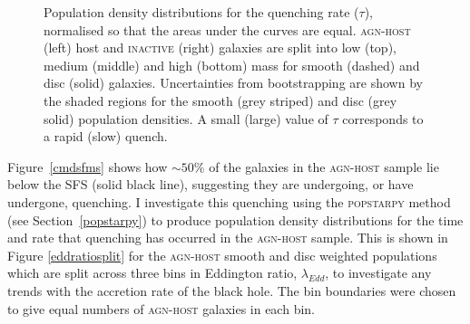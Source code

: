 \begin{figure}
\caption[Quenching rate population density distributions for the \textsc{agn-host} and \textsc{inactive} samples]{Population density distributions for the quenching rate ($\tau$), normalised so that the areas under the curves are equal. \textsc{agn-host} (left) host and \textsc{inactive} (right) galaxies are split into low (top), medium (middle) and high (bottom) mass for smooth (dashed) and disc (solid) galaxies. Uncertainties from bootstrapping are shown by the shaded regions for the smooth (grey striped) and disc (grey solid) population densities. A small (large) value of $\tau$ corresponds to a rapid (slow) quench.}
\label{rate}
\end{figure}



Figure~\ref{cmdsfms} shows how $\sim50\%$ of the galaxies in the \textsc{agn-host} sample lie below the SFS (solid black line), suggesting they are undergoing, or have undergone, quenching. I investigate this quenching using the \textsc{popstarpy} method (see Section~\ref{popstarpy}) to produce population density distributions for the time and rate that quenching has occurred in the \textsc{agn-host} sample. This is shown in Figure \ref{eddratiosplit} for the \textsc{agn-host} smooth and disc weighted populations which are split across three bins in Eddington ratio, $\lambda_{Edd}$, to investigate any trends with the accretion rate of the black hole. The bin boundaries were chosen to give equal numbers of \textsc{agn-host} galaxies in each bin. 

